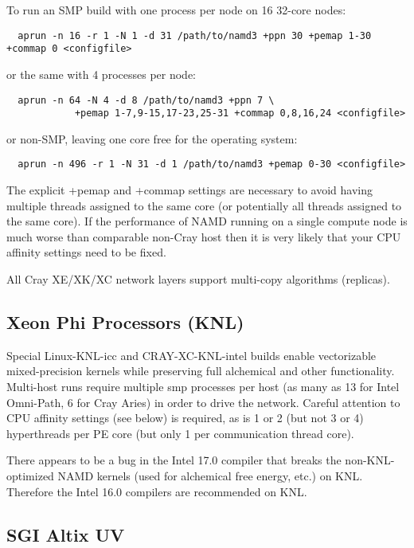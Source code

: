 To run an SMP build with one process per node on 16 32-core nodes:

\begin{verbatim}
  aprun -n 16 -r 1 -N 1 -d 31 /path/to/namd3 +ppn 30 +pemap 1-30 +commap 0 <configfile>
\end{verbatim}

or the same with 4 processes per node:

\begin{verbatim}
  aprun -n 64 -N 4 -d 8 /path/to/namd3 +ppn 7 \
            +pemap 1-7,9-15,17-23,25-31 +commap 0,8,16,24 <configfile>
\end{verbatim}

or non-SMP, leaving one core free for the operating system:

\begin{verbatim}
  aprun -n 496 -r 1 -N 31 -d 1 /path/to/namd3 +pemap 0-30 <configfile>
\end{verbatim}

The explicit +pemap and +commap settings are necessary to avoid having
multiple threads assigned to the same core (or potentially all threads
assigned to the same core).  If the performance of NAMD running on a
single compute node is much worse than comparable non-Cray host then
it is very likely that your CPU affinity settings need to be fixed.

All Cray XE/XK/XC network layers support multi-copy algorithms (replicas).

\subsection{Xeon Phi Processors (KNL)}

Special Linux-KNL-icc and CRAY-XC-KNL-intel builds enable vectorizable
mixed-precision kernels while preserving full alchemical and other
functionality.  Multi-host runs require multiple smp processes per host
(as many as 13 for Intel Omni-Path, 6 for Cray Aries) in order to drive
the network. Careful attention to CPU affinity settings (see below) is
required, as is 1 or 2 (but not 3 or 4) hyperthreads per PE core (but
only 1 per communication thread core).

There appears to be a bug in the Intel 17.0 compiler that breaks the 
non-KNL-optimized NAMD kernels (used for alchemical free energy, etc.) 
on KNL.  Therefore the Intel 16.0 compilers are recommended on KNL.

\subsection{SGI Altix UV}

